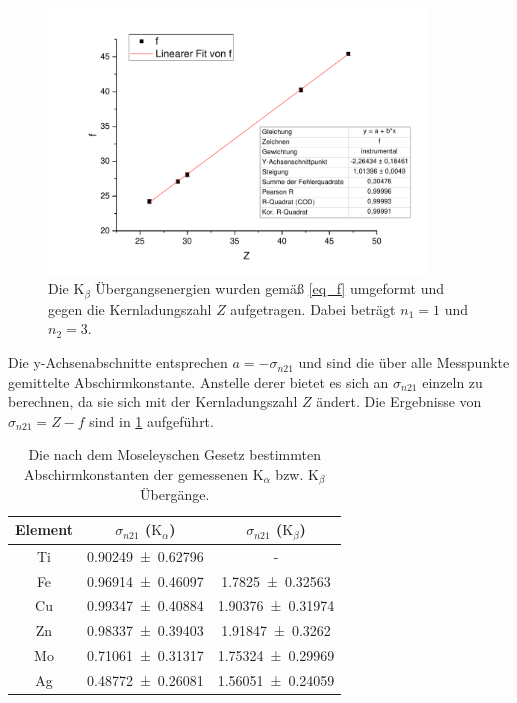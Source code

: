 \documentclass[
	a4paper,
	12pt,
	pagesize,
	ngerman
]{scrartcl}
\begin{document}
	\begin{figure}[H]
		\includegraphics[width=0.9\textwidth]{Kb}
		\centering
		\caption{Die $\text{K}_\beta$ Übergangsenergien wurden gemäß \cref{eq_f} umgeformt und gegen die Kernladungszahl $Z$ aufgetragen. Dabei beträgt $n_1=1$ und $n_2=3$.}
			\label{fig_Kb}
			\centering
	\end{figure}
	
	Die y-Achsenabschnitte entsprechen $a=-\sigma_{n21}$ und sind die über alle Messpunkte gemittelte Abschirmkonstante.
	Anstelle derer bietet es sich an $\sigma_{n21}$ einzeln zu berechnen, da sie sich mit der Kernladungszahl $Z$ ändert.
	Die Ergebnisse von $\sigma_{n21}=Z-f$ sind in \cref{tb_abschirm} aufgeführt.
	
	\begin{table}[H]
		\centering
		\begin{tabular}{ c | c | c}
			Element & $\sigma_{n21}$ ($\text{K}_\alpha$) &  $\sigma_{n21}$ ($\text{K}_\beta$)\\ \hline \hline
			Ti & \SI{0,90249+-0,62796}{} & - \\
			Fe & \SI{0,96914+-0,46097}{} & \SI{1,7825+-0,32563}{} \\
			Cu & \SI{0,99347+-0,40884}{} & \SI{1,90376+-0,31974}{} \\
			Zn & \SI{0.98337+-0.39403}{} & \SI{1.91847+-0.3262}{} \\
			Mo & \SI{0,71061+-0,31317}{} & \SI{1,75324+-0,29969}{} \\
			Ag & \SI{0,48772+-0,26081}{} & \SI{1,56051+-0,24059}{} \\		
		\end{tabular}
	\caption{Die nach dem Moseleyschen Gesetz bestimmten Abschirmkonstanten der gemessenen $\text{K}_\alpha$ bzw. $\text{K}_\beta$ Übergänge.}
	\label{tb_abschirm} 
	\end{table}	
\end{document}
